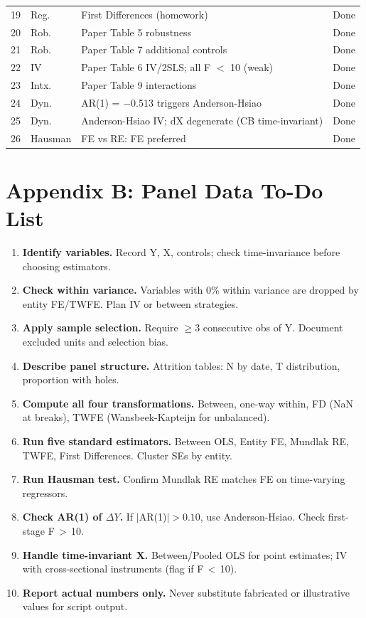 \documentclass[12pt,a4paper]{article}
\begin{document}
\begin{longtable}{cp{1.5cm}p{7cm}l}
19 & Reg.    & First Differences (homework)                         & Done \\
20 & Rob.    & Paper Table 5 robustness                             & Done \\
21 & Rob.    & Paper Table 7 additional controls                    & Done \\
22 & IV      & Paper Table 6 IV/2SLS; all F $<$ 10 (weak)          & Done \\
23 & Intx.   & Paper Table 9 interactions                           & Done \\
24 & Dyn.    & AR(1) = $-$0.513 triggers Anderson-Hsiao             & Done \\
25 & Dyn.    & Anderson-Hsiao IV; dX degenerate (CB time-invariant) & Done \\
26 & Hausman & FE vs RE: FE preferred                               & Done \\
\bottomrule
\end{longtable}

\section{Appendix B: Panel Data To-Do List}

\begin{enumerate}
\item \textbf{Identify variables.} Record Y, X, controls; check
  time-invariance before choosing estimators.
\item \textbf{Check within variance.} Variables with 0\% within variance are
  dropped by entity FE/TWFE. Plan IV or between strategies.
\item \textbf{Apply sample selection.} Require $\geq 3$ consecutive obs of Y.
  Document excluded units and selection bias.
\item \textbf{Describe panel structure.} Attrition tables: N by date, T
  distribution, proportion with holes.
\item \textbf{Compute all four transformations.} Between, one-way within, FD
  (NaN at breaks), TWFE (Wansbeek-Kapteijn for unbalanced).
\item \textbf{Run five standard estimators.} Between OLS, Entity FE, Mundlak
  RE, TWFE, First Differences. Cluster SEs by entity.
\item \textbf{Run Hausman test.} Confirm Mundlak RE matches FE on
  time-varying regressors.
\item \textbf{Check AR(1) of $\Delta Y$.} If $|$AR(1)$|>0.10$, use
  Anderson-Hsiao. Check first-stage F\,$>$\,10.
\item \textbf{Handle time-invariant X.} Between/Pooled OLS for point
  estimates; IV with cross-sectional instruments (flag if F\,$<$\,10).
\item \textbf{Report actual numbers only.} Never substitute fabricated or
  illustrative values for script output.
\end{enumerate}
\end{document}
